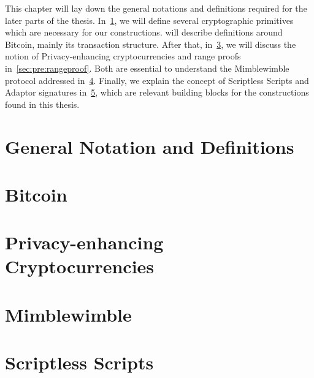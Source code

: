 This chapter will lay down the general notations and definitions required for the later parts of the thesis.
In~\cref{sec:pre:general}, we will define several cryptographic primitives which are necessary for our constructions.
 will describe definitions around Bitcoin, mainly its transaction structure.
After that, in~\cref{sec:pre:privacy}, we will discuss the notion of Privacy-enhancing cryptocurrencies and range proofs in~\cref{sec:pre:rangeproof}.
Both are essential to understand the Mimblewimble protocol addressed in~\cref{sec:pre:mimblewimble}.
Finally, we explain the concept of Scriptless Scripts and Adaptor signatures in~\cref{sec:pre:scriptless-scripts}, which are relevant building blocks for the constructions found in this thesis.

\section{General Notation and Definitions}\label{sec:pre:general}


\section{Bitcoin} \label{sec:pre:bitcoin}


\section{Privacy-enhancing Cryptocurrencies} \label{sec:pre:privacy}


\section{Mimblewimble} \label{sec:pre:mimblewimble}


\section{Scriptless Scripts} \label{sec:pre:scriptless-scripts}


